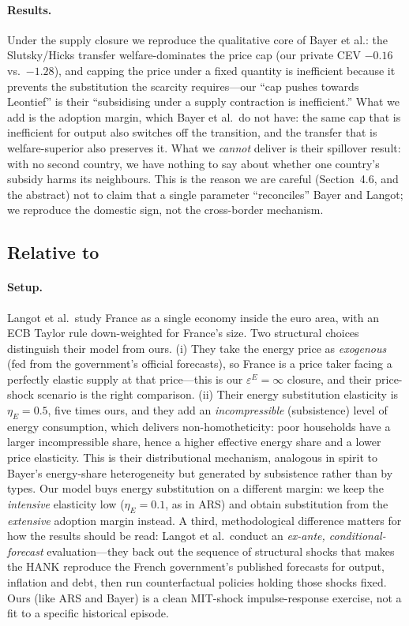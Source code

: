 \documentclass[11pt,a4paper]{article}
\begin{document}
\paragraph{Results.} Under the supply closure we reproduce the qualitative
core of Bayer et al.: the Slutsky/Hicks transfer welfare-dominates the price
cap (our private CEV $-0.16$ vs.\ $-1.28$), and capping the price under a fixed
quantity is inefficient because it prevents the substitution the scarcity
requires---our ``cap pushes towards Leontief'' is their ``subsidising under a
supply contraction is inefficient.'' What we add is the adoption margin, which
Bayer et al.\ do not have: the same cap that is inefficient for output also
switches off the transition, and the transfer that is welfare-superior also
preserves it. What we \emph{cannot} deliver is their spillover result: with no
second country, we have nothing to say about whether one country's subsidy
harms its neighbours. This is the reason we are careful (Section~4.6, and the
abstract) not to claim that a single parameter ``reconciles'' Bayer and Langot;
we reproduce the domestic sign, not the cross-border mechanism.

\subsection{Relative to \citet{Langot2026}}

\paragraph{Setup.} Langot et al.\ study France as a single economy inside the
euro area, with an ECB Taylor rule down-weighted for France's size. Two
structural choices distinguish their model from ours. (i) They take the energy
price as \emph{exogenous} (fed from the government's official forecasts), so
France is a price taker facing a perfectly elastic supply at that price---this
is our $\varepsilon^E=\infty$ closure, and their price-shock scenario is the
right comparison. (ii) Their energy substitution elasticity is $\eta_E=0.5$,
five times ours, and they add an \emph{incompressible} (subsistence) level of
energy consumption, which delivers non-homotheticity: poor households have a
larger incompressible share, hence a higher effective energy share and a lower
price elasticity. This is their distributional mechanism, analogous in spirit
to Bayer's energy-share heterogeneity but generated by subsistence rather than
by types. Our model buys energy substitution on a different margin: we keep the
\emph{intensive} elasticity low ($\eta_E=0.1$, as in ARS) and obtain
substitution from the \emph{extensive} adoption margin instead. A third,
methodological difference matters for how the results should be read: Langot et
al.\ conduct an \emph{ex-ante, conditional-forecast} evaluation---they back out
the sequence of structural shocks that makes the HANK reproduce the French
government's published forecasts for output, inflation and debt, then run
counterfactual policies holding those shocks fixed. Ours (like ARS and Bayer)
is a clean MIT-shock impulse-response exercise, not a fit to a specific
historical episode.
\end{document}
